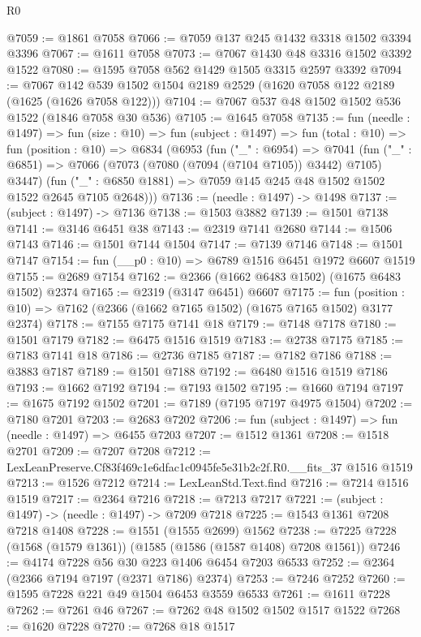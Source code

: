 \begin{lexlean}{R0}
\begin{coremodule}
@7059 := @1861 @7058
@7066 := @7059 @137 @245 @1432 @3318 @1502 @3394 @3396
@7067 := @1611 @7058
@7073 := @7067 @1430 @48 @3316 @1502 @3392 @1522
@7080 := @1595 @7058 @562 @1429 @1505 @3315 @2597 @3392
@7094 := @7067 @142 @539 @1502 @1504 @2189 @2529 (@1620 @7058 @122 @2189 (@1625 (@1626 @7058 @122)))
@7104 := @7067 @537 @48 @1502 @1502 @536 @1522 (@1846 @7058 @30 @536)
@7105 := @1645 @7058
@7135 := fun (needle : @1497) =>
  fun (size : @10) =>
  fun (subject : @1497) =>
  fun (total : @10) =>
  fun (position : @10) =>
  @6834
    (@6953
      (fun ("_" : @6954) =>
      @7041
        (fun ("_" : @6851) => @7066 (@7073 (@7080 (@7094 (@7104 @7105)) @3442) @7105) @3447)
        (fun ("_" : @6850 @1881) => @7059 @145 @245 @48 @1502 @1502 @1522 @2645 @7105 @2648)))
@7136 := (needle : @1497) -> @1498
@7137 := (subject : @1497) -> @7136
@7138 := @1503 @3882
@7139 := @1501 @7138
@7141 := @3146 @6451 @38
@7143 := @2319 @7141 @2680
@7144 := @1506 @7143
@7146 := @1501 @7144 @1504
@7147 := @7139 @7146
@7148 := @1501 @7147
@7154 := fun (__p0 : @10) => @6789 @1516 @6451 @1972 @6607 @1519
@7155 := @2689 @7154
@7162 := @2366 (@1662 @6483 @1502) (@1675 @6483 @1502) @2374
@7165 := @2319 (@3147 @6451) @6607
@7175 := fun (position : @10) => @7162 (@2366 (@1662 @7165 @1502) (@1675 @7165 @1502) @3177 @2374)
@7178 := @7155 @7175 @7141 @18
@7179 := @7148 @7178
@7180 := @1501 @7179
@7182 := @6475 @1516 @1519
@7183 := @2738 @7175
@7185 := @7183 @7141 @18
@7186 := @2736 @7185
@7187 := @7182 @7186
@7188 := @3883 @7187
@7189 := @1501 @7188
@7192 := @6480 @1516 @1519 @7186
@7193 := @1662 @7192
@7194 := @7193 @1502
@7195 := @1660 @7194
@7197 := @1675 @7192 @1502
@7201 := @7189 (@7195 @7197 @4975 @1504)
@7202 := @7180 @7201
@7203 := @2683 @7202
@7206 := fun (subject : @1497) => fun (needle : @1497) => @6455 @7203
@7207 := @1512 @1361
@7208 := @1518 @2701
@7209 := @7207 @7208
@7212 := LexLeanPreserve.Cf83f469c1e6dfac1c0945fe5e31b2c2f.R0.__fits_37 @1516 @1519
@7213 := @1526 @7212
@7214 := LexLeanStd.Text.find
@7216 := @7214 @1516 @1519
@7217 := @2364 @7216
@7218 := @7213 @7217
@7221 := (subject : @1497) -> (needle : @1497) -> @7209 @7218
@7225 := @1543 @1361 @7208 @7218 @1408
@7228 := @1551 (@1555 @2699) @1562
@7238 := @7225 @7228 (@1568 (@1579 @1361)) (@1585 (@1586 (@1587 @1408) @7208 @1561))
@7246 := @4174 @7228 @56 @30 @223 @1406 @6454 @7203 @6533
@7252 := @2364 (@2366 @7194 @7197 (@2371 @7186) @2374)
@7253 := @7246 @7252
@7260 := @1595 @7228 @221 @49 @1504 @6453 @3559 @6533
@7261 := @1611 @7228
@7262 := @7261 @46
@7267 := @7262 @48 @1502 @1502 @1517 @1522
@7268 := @1620 @7228
@7270 := @7268 @18 @1517

\end{coremodule}
\end{lexlean}
